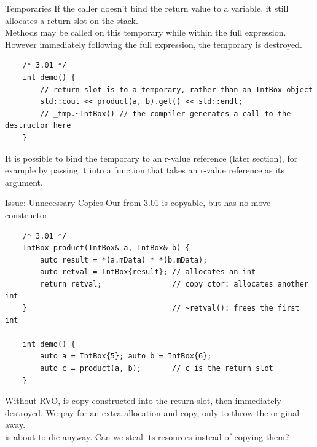 \begin{frame}[fragile]{Temporaries}
  If the caller doesn't bind the return value to a variable,
  it still allocates a return slot on the stack.\\
  Methods may be called on this temporary while within the full expression.\\
  However immediately following the full expression, the temporary is destroyed.
  \begin{verbatim}
    /* 3.01 */
    int demo() {
        // return slot is to a temporary, rather than an IntBox object
        std::cout << product(a, b).get() << std::endl;
        // _tmp.~IntBox() // the compiler generates a call to the destructor here
    }
  \end{verbatim}

  It is possible to bind the temporary to an r-value reference (later section),
  for example by passing it into a function that takes an r-value reference as its argument.
\end{frame}

\begin{frame}[fragile]{Issue: Unnecessary Copies}
  Our  from 3.01 is copyable, but has no move constructor.
  \begin{verbatim}
    /* 3.01 */
    IntBox product(IntBox& a, IntBox& b) {
        auto result = *(a.mData) * *(b.mData);
        auto retval = IntBox{result}; // allocates an int
        return retval;                // copy ctor: allocates another int
    }                                 // ~retval(): frees the first int

    int demo() {
        auto a = IntBox{5}; auto b = IntBox{6};
        auto c = product(a, b);       // c is the return slot
    }
  \end{verbatim}
  Without RVO,  is copy constructed into the return slot,
  then immediately destroyed.
  We pay for an extra allocation and copy, only to throw the original away.\\[0.5em]
  \textcolor{sqt-question}{ is about to die anyway.
  Can we steal its resources instead of copying them?}
\end{frame}

